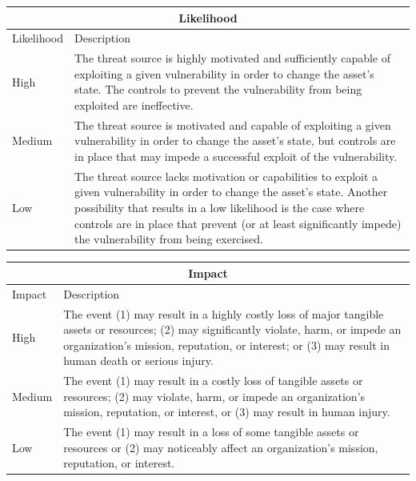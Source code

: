 \documentclass[english]{article}
\begin{document}



\begin{center}
\begin{table}[h]
\begin{tabularx}{\textwidth}{|l|X|}
\hline
\multicolumn{2}{|c|}{\bf Likelihood} \\
\hline
Likelihood & Description \\
\hline
\hline
High & The threat source is highly motivated and sufficiently capable of exploiting a given vulnerability in order to change the asset’s state. The controls to prevent the vulnerability from being exploited are ineffective.\\
\hline
Medium & The threat source is motivated and capable of exploiting a given vulnerability in order to change the asset’s state, but controls are in place that may impede a successful exploit of the vulnerability. \\
\hline
Low   & The threat source lacks motivation or capabilities to exploit a given vulnerability in order to change the asset’s state. Another possibility that results in a low likelihood is the case where controls are in place that prevent (or at least significantly impede) the vulnerability from being exercised. \\
\hline
\end{tabularx}
\end{table}
\hspace{3em}
\begin{table}[h]
\begin{tabularx}{\textwidth}{|l|X|}
\hline
\multicolumn{2}{|c|}{\bf Impact} \\
\hline
Impact & Description \\
\hline
\hline
High   & The event (1) may result in a highly costly loss of major tangible assets or resources; (2) may significantly violate, harm, or impede an organization’s mission, reputation, or interest; or (3) may result in human death or serious injury. \\
\hline
Medium & The event (1) may result in a costly loss of tangible assets or resources; (2) may violate, harm, or impede an organization’s mission, reputation, or interest, or (3) may result in human injury.\\
\hline
Low & The event (1) may result in a loss of some tangible assets or resources or (2) may noticeably affect an organization’s mission, reputation, or interest.\\
\hline
\end{tabularx}
\end{table}
\end{center}
\end{document}
